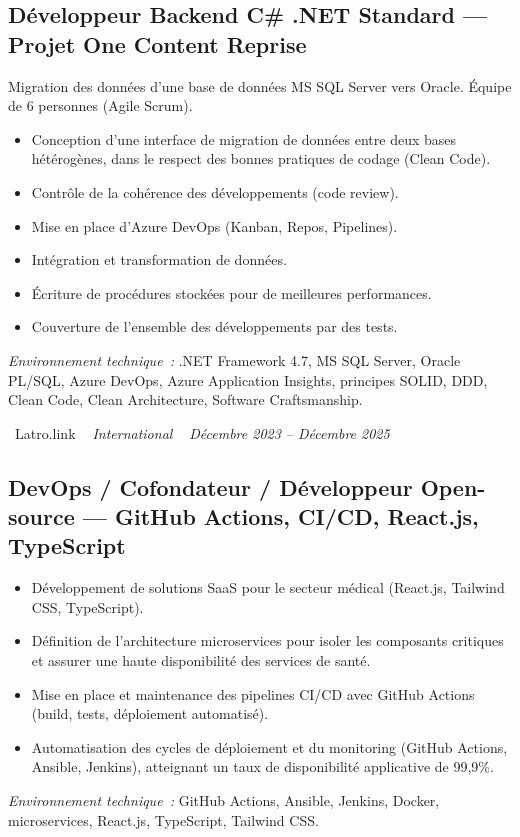 \documentclass[10pt,a4paper]{article}
\begin{document}
\vspace{6pt}

\subsection*{Développeur Backend C\# .NET Standard --- Projet One Content Reprise}
\color{darkgray}
Migration des données d'une base de données MS SQL Server vers Oracle. Équipe de 6 personnes (Agile Scrum).
\begin{itemize}
  \item Conception d'une interface de migration de données entre deux bases hétérogènes, dans le respect des bonnes pratiques de codage (Clean Code).
  \item Contrôle de la cohérence des développements (code review).
  \item Mise en place d'Azure DevOps (Kanban, Repos, Pipelines).
  \item Intégration et transformation de données.
  \item Écriture de procédures stockées pour de meilleures performances.
  \item Couverture de l'ensemble des développements par des tests.
\end{itemize}
\textit{Environnement technique~:} .NET Framework 4.7, MS SQL Server, Oracle PL/SQL, Azure DevOps, Azure Application Insights, principes SOLID, DDD, Clean Code, Clean Architecture, Software Craftsmanship.

\vspace{10pt}

\noindent\textcolor{primary}{ \faBuilding\ Latro.link} \quad
\textit{ \small \textcolor{darkgray}{ \faMapMarker\ } International } \hfill
\textit{ \small \textcolor{darkgray}{ \faCalendar\ } Décembre 2023 -- Décembre 2025 }

\vspace{4pt}

\subsection*{DevOps / Cofondateur / Développeur Open-source --- GitHub Actions, CI/CD, React.js, TypeScript}
\color{darkgray}
\begin{itemize}
  \item Développement de solutions SaaS pour le secteur médical (React.js, Tailwind CSS, TypeScript).
  \item Définition de l'architecture microservices pour isoler les composants critiques et assurer une haute disponibilité des services de santé.
  \item Mise en place et maintenance des pipelines CI/CD avec GitHub Actions (build, tests, déploiement automatisé).
  \item Automatisation des cycles de déploiement et du monitoring (GitHub Actions, Ansible, Jenkins), atteignant un taux de disponibilité applicative de 99,9\%.
\end{itemize}
\textit{Environnement technique~:} GitHub Actions, Ansible, Jenkins, Docker, microservices, React.js, TypeScript, Tailwind CSS.
\end{document}
